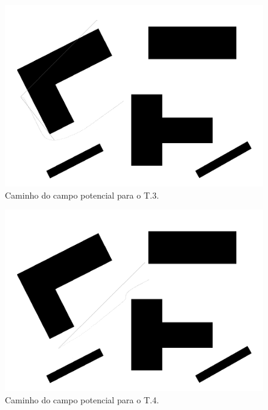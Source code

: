 \documentclass[12pt]{article}
\theoremstyle{plain}
\numberwithin{equation}{section}
\begin{document}
\begin{figure}[H]
  \centering\includegraphics[scale=0.4]{imgs/potential_field_2.png}
  \caption{Caminho do campo potencial para o T.3.}
\end{figure}

\begin{figure}[H]
  \centering\includegraphics[scale=0.4]{imgs/potential_field_3.png}
  \caption{Caminho do campo potencial para o T.4.}
\end{figure}
\end{document}
